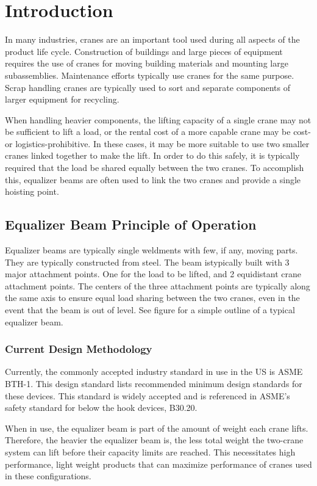 \chapter{Introduction}
In many industries, cranes are an important tool used during all aspects of the product life cycle. Construction of buildings and large pieces of equipment requires the use of cranes for moving building materials and mounting large subassemblies. Maintenance efforts typically use cranes for the same purpose. Scrap handling cranes are typically used to sort and separate components of larger equipment for recycling.

When handling heavier components, the lifting capacity of a single crane may not be sufficient to lift a load, or the rental cost of a more capable crane may be cost- or logistics-prohibitive. In these cases, it may be more suitable to use two smaller cranes linked together to make the lift. In order to do this safely, it is typically required that the load be shared equally between the two cranes. To accomplish this, equalizer beams are often used to link the two cranes and provide a single hoisting point.

\section{Equalizer Beam Principle of Operation} 

Equalizer beams are typically single weldments with few, if any, moving parts. They are typically constructed from steel. The beam istypically built with 3 major attachment points. One for the load to be lifted, and 2 equidistant crane attachment points. The centers of the three attachment points are typically along the same axis to ensure equal load sharing between the two cranes, even in the event that the beam is out of level. See figure  for a simple outline of a typical equalizer beam.

\subsection{Current Design Methodology}

Currently, the commonly accepted industry standard in use in the US is ASME BTH-1. This design standard lists recommended minimum design standards for these devices. This standard is widely accepted and is referenced in ASME's safety standard for below the hook devices, B30.20.

When in use, the equalizer beam is part of the amount of weight each crane lifts. Therefore, the heavier the equalizer beam is, the less total weight the two-crane system can lift before their capacity limits are reached. This necessitates high performance, light weight products that can maximize performance of cranes used in these configurations. 

